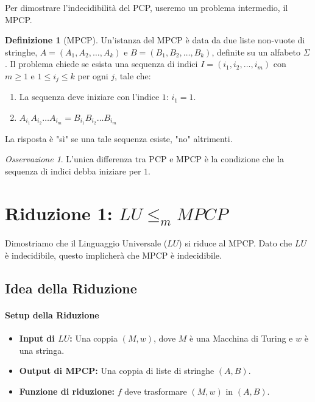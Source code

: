 \documentclass[a4paper]{article}
\theoremstyle{definition} %
\newtheorem{definition}{Definizione}
\theoremstyle{remark} %
\newtheorem{remark}{Osservazione}
\begin{document}
Per dimostrare l'indecidibilità del PCP, useremo un problema intermedio, il MPCP.

\begin{definition}[MPCP]
Un'istanza del MPCP è data da due liste non-vuote di stringhe, $A = (A_1, A_2, \dots, A_k)$ e $B = (B_1, B_2, \dots, B_k)$, definite su un alfabeto $\Sigma$.
Il problema chiede se esista una sequenza di indici $I = (i_1, i_2, \dots, i_m)$ con $m \ge 1$ e $1 \le i_j \le k$ per ogni $j$, tale che:
\begin{enumerate}
    \item La sequenza deve iniziare con l'indice $1$: $i_1 = 1$.
    \item $A_{i_1} A_{i_2} \dots A_{i_m} = B_{i_1} B_{i_2} \dots B_{i_m}$
\end{enumerate}
La risposta è "sì" se una tale sequenza esiste, "no" altrimenti.
\end{definition}

\begin{remark}
L'unica differenza tra PCP e MPCP è la condizione che la sequenza di indici debba iniziare per $1$.
\end{remark}

\section{Riduzione 1: $LU \le_m MPCP$}

Dimostriamo che il Linguaggio Universale ($LU$) si riduce al MPCP. Dato che $LU$ è indecidibile, questo implicherà che MPCP è indecidibile.

\subsection{Idea della Riduzione}

\paragraph{Setup della Riduzione}
\begin{itemize}
    \item \textbf{Input di $LU$:} Una coppia $(M, w)$, dove $M$ è una Macchina di Turing e $w$ è una stringa.
    \item \textbf{Output di MPCP:} Una coppia di liste di stringhe $(A, B)$.
    \item \textbf{Funzione di riduzione:} $f$ deve trasformare $(M, w)$ in $(A, B)$.
\end{itemize}
\end{document}
